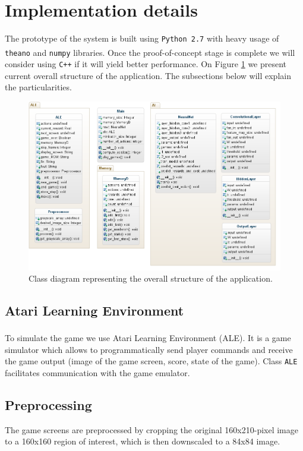 \documentclass[a4paper,12pt]{article}
\begin{document}
%
%
\pagebreak
\section{Implementation details}
The prototype of the system is built using \texttt{Python 2.7} with heavy usage of \texttt{theano}\textsuperscript{\cite{bergstra2010theano}} and \texttt{numpy}\textsuperscript{\cite{oliphant2007python}} libraries. Once the proof-of-concept stage is complete we will consider using \texttt{C++} if it will yield better performance. On Figure \ref{fig:classdiagram} we present current overall structure of the application. The subsections below will explain the particularities.

\begin{figure}[h]
	\centering
	\includegraphics[width=\textwidth]{images/DeepMind-diag.png}
	\caption{Class diagram representing the overall structure of the application.}
	\label{fig:classdiagram}
\end{figure}




\subsection{Atari Learning Environment}
To simulate the game we use Atari Learning Environment (ALE)\textsuperscript{\cite{bellemare13arcade}}. It is a game simulator which allows to programmatically send player commands and receive the game output (image of the game screen, score, state of the game). Class \texttt{ALE} facilitates communication with the game emulator.

\subsection{Preprocessing}
\label{subsection_preproc}
The game screens are preprocessed by cropping the original 160x210-pixel image to a 160x160 region of interest, which is then downscaled to a 84x84 image.
\end{document}
